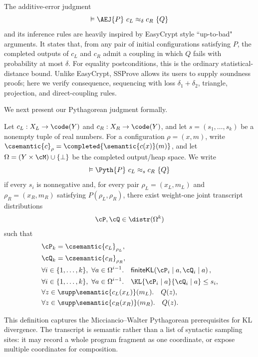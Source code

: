 The additive-error judgment
\[
 \vDash\AEJ\{P\}\ c_L\approx_\delta c_R\ \{Q\}
\]
and its inference rules are heavily inspired by EasyCrypt style ``up-to-bad" arguments.
It states that, from any pair of initial configurations satisfying \(P\), the
completed outputs of \(c_L\) and \(c_R\) admit a coupling in which \(Q\) fails
with probability at most \(\delta\).
For equality postconditions, this is the ordinary statistical-distance bound.
Unlike EasyCrypt, SSProve allows its users to supply soundness proofs;
here we verify consequence, sequencing with loss \(\delta_1+\delta_2\),
triangle, projection, and direct-coupling rules.

We next present our Pythagorean judgment formally.

\begin{definition}
\label{def:pyth-judgment}
Let \(c_L:X_L\to\code(Y)\) and \(c_R:X_R\to\code(Y)\), and let
\(s=(s_1,\ldots,s_k)\) be a nonempty tuple of real numbers.
For a configuration \(\rho=(x,m)\), write
\(\csemantic{c}_{\rho}=\completed{\semantic{c(x)}(m)}\), and let
\(\Omega=(Y\times\cM)\cup\{\bot\}\) be the completed output/heap space.
We write
\begin{equation}
 \vDash\Pyth\{P\}\ c_L\approx_s c_R\ \{Q\}
\end{equation}
if every \(s_i\) is nonnegative and, for every pair
\(\rho_L=(x_L,m_L)\) and \(\rho_R=(x_R,m_R)\) satisfying
\(P(\rho_L,\rho_R)\), there exist weight-one joint transcript distributions
\[
 \cP,\cQ\in\distr(\Omega^k)
\]
such that
\[
\begin{aligned}
 &\cP_k=\csemantic{c_L}_{\rho_L},
 \\
 &\cQ_k=\csemantic{c_R}_{\rho_R},
 \\
 &\forall i\in\{1,\ldots,k\},\ \forall a\in\Omega^{i-1}.\quad
   \mathsf{finiteKL}\!\left(
     \cP_i\mid a,\cQ_i\mid a\right),
 \\
 &\forall i\in\{1,\ldots,k\},\ \forall a\in\Omega^{i-1}.\quad
   \KL{\cP_i\mid a}{\cQ_i\mid a}\leq s_i,
 \\
 &\forall z\in\supp\semantic{c_L(x_L)}(m_L).\quad Q(z),
 \\
 &\forall z\in\supp\semantic{c_R(x_R)}(m_R).\quad Q(z).
\end{aligned}
\]
\end{definition}

This definition captures the Micciancio--Walter \cite{mw17} Pythagorean
prerequisites for KL divergence.
The transcript is semantic rather than a list of syntactic sampling sites: it may record a
whole program fragment as one coordinate, or expose multiple coordinates for
composition.

